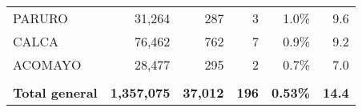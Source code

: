 \begin{tabular}{lrrrrr}
	\cellcolor[HTML]{9AFF99}PARURO        & 31,264                                                         & 287                                                                              & 3                                                                & 1.0\%                                                                  & 9.6                                                                                                                               \\
	\cellcolor[HTML]{9AFF99}CALCA         & 76,462                                                         & 762                                                                              & 7                                                                & 0.9\%                                                                  & 9.2                                                                                                                               \\
	\cellcolor[HTML]{9AFF99}ACOMAYO       & 28,477                                                         & 295                                                                              & 2                                                                & 0.7\%                                                                  & 7.0                                                                                                                               \\
	&                                                                &                                                                                  &                                                                  &                                                                        &                                                                                                                                   \\
	\rowcolor[HTML]{ECF4FF} 
	\textbf{Total general}                & \textbf{1,357,075}                                             & \textbf{37,012}                                                                  & \textbf{196}                                                     & \textbf{0.53\%}                                                        & \textbf{14.4}                                                                                                                    
\end{tabular}